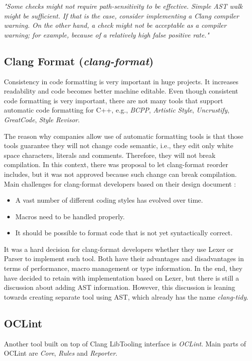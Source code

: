 \label{clang-analyzer-checkers}
\emph{"Some checks might not require path-sensitivity to be effective. Simple AST walk might be sufficient. If that is the case, consider implementing a Clang compiler warning. On the other hand, a check might not be acceptable as a compiler warning; for example, because of a relatively high false positive rate."}

\subsection{Clang Format (\emph{clang-format})}
\label{clang-format}
Consistency in code formatting is very important in huge projects. It increases readability and code becomes better machine editable. Even though consistent code formatting is very important, there are not many tools that support automatic code formatting for C++, e.g., \emph{BCPP}, \emph{Artistic Style}, \emph{Uncrustify}, \emph{GreatCode}, \emph{Style Revisor}.

The reason why companies allow use of automatic formatting tools is that those tools guarantee they will not change code semantic, i.e., they edit only white space characters, literals and comments. Therefore, they will not break compilation. In this context, there was proposal to let clang-format reorder includes, but it was not approved because such change can break compilation. Main challenges for clang-format developers based on their design document \cite{clang-format-design}:

\begin{itemize}
\item A vast number of different coding styles has evolved over time.
\item Macros need to be handled properly.
\item It should be possible to format code that is not yet syntactically correct.
\end{itemize}

It was a hard decision for clang-format developers whether they use Lexer or Parser to implement such tool. Both have their advantages and disadvantages in terms of performance, macro management or type information. In the end, they have decided to retain with implementation based on Lexer, but there is still a discussion about adding AST information. However, this discussion is leaning towards creating separate tool using AST, which already has the name \emph{clang-tidy}.

\subsection{OCLint}
Another tool built on top of Clang LibTooling interface is \emph{OCLint}. Main parts of OCLint are \emph{Core}, \emph{Rules} and \emph{Reporter}.


